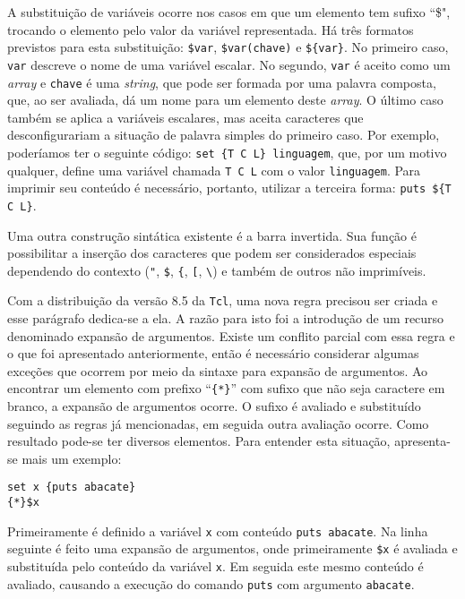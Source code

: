 A substituição de variáveis ocorre nos
casos em que um elemento tem sufixo ``\$", trocando o elemento pelo
valor da variável representada. Há três formatos previstos para esta
substituição: \verb!$var!, \verb!$var(chave)! e
\verb!${var}!. No primeiro caso, \verb!var! descreve o nome de uma
variável escalar. No segundo, \verb!var! é aceito como um \textit{array}
e \verb!chave! é uma \textit{string}, que pode ser formada
por uma palavra composta, que, ao ser avaliada, dá um nome para um
elemento deste \textit{array}. O último caso também se aplica a
variáveis escalares, mas aceita caracteres que desconfigurariam a
situação de palavra simples do primeiro caso. Por exemplo, poderíamos
ter o seguinte código: \verb!set {T C L} linguagem!, que, por um
motivo qualquer, define uma variável chamada \verb!T C L! com o valor
\verb!linguagem!. Para imprimir seu conteúdo é necessário, portanto,
utilizar a terceira forma: \verb!puts ${T C L}!.

Uma outra construção sintática existente é a barra invertida. Sua
função é possibilitar a inserção dos caracteres que podem ser
considerados especiais dependendo do contexto (\verb!"!, \verb!$!,
\verb!{!, \verb![!, \verb!\!) e também de outros não imprimíveis.


Com a distribuição da versão 8.5 da \texttt{Tcl}, uma nova
regra precisou ser criada e esse parágrafo dedica-se a ela. A razão
para isto foi a introdução de um recurso denominado expansão de
argumentos. Existe um
conflito parcial com essa regra e o que foi apresentado anteriormente,
então é necessário considerar algumas exceções que ocorrem por meio da
sintaxe para expansão de argumentos. Ao encontrar um elemento com
prefixo ``\verb!{*}!'' com sufixo que não seja caractere em
branco, a expansão de argumentos ocorre. O sufixo é avaliado e
substituído seguindo as regras já mencionadas, em seguida outra
avaliação ocorre. Como resultado pode-se ter diversos elementos. Para
entender esta situação, apresenta-se mais um exemplo:
\begin{verbatim}
set x {puts abacate}
{*}$x
\end{verbatim}
Primeiramente é definido a variável \verb!x! com conteúdo
\verb!puts abacate!. Na linha seguinte é feito uma expansão de argumentos, onde
primeiramente \verb!$x! é avaliada e substituída pelo conteúdo da
variável \verb!x!. Em seguida este mesmo conteúdo é avaliado, causando
a execução do comando \verb!puts! com argumento \verb!abacate!.

